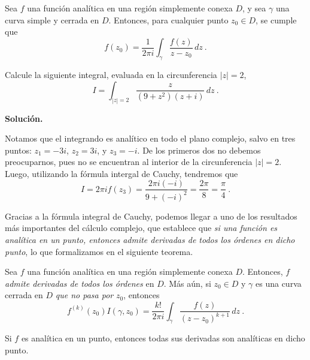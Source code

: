 \begin{corolario}
    Sea $f$ una función analítica en una región simplemente conexa $D$, y sea $\gamma$ una curva simple y cerrada en $D$. Entonces, para cualquier punto $z_0 \in D$, se cumple que 
    \begin{equation}
        f(z_0) = \frac{1}{2\pi i} \int_\gamma \frac{f(z)}{z-z_0} \, dz \ .
    \end{equation}
\end{corolario}

\begin{ejemplo}
    Calcule la siguiente integral, evaluada en la circunferencia $|z| = 2$,
    \begin{equation*}
        I = \int_{|z|=2} \frac{z}{(9+z^2)(z+i)} \, dz \ .
    \end{equation*}

    \noindent \textbf{Solución.}

    Notamos que el integrando es analítico en todo el plano complejo, salvo en tres puntos: $z_1 = -3i$, $z_2 = 3i$, y $z_3 = -i$. De los primeros dos no debemos preocuparnos, pues no se encuentran al interior de la circunferencia $|z| = 2$. Luego, utilizando la fórmula intergal de Cauchy, tendremos que 
    \begin{equation*}
        I = 2\pi i f(z_3) = \frac{2\pi i (-i)}{9+(-i)^2} = \frac{2\pi}{8} = \frac{\pi}{4} \ .
    \end{equation*}
\end{ejemplo}

Gracias a la fórmula integral de Cauchy, podemos llegar a uno de los resultados más importantes del cálculo complejo, que establece que \emph{si una función es analítica en un punto, entonces admite derivadas de todos los órdenes en dicho punto}, lo que formalizamos en el siguiente teorema.

\begin{teorema}
    Sea $f$ una función analítica en una región simplemente conexa $D$. Entonces, $f$ \emph{admite derivadas de todos los órdenes} en $D$. Más aún, si $z_0 \in D$ y $\gamma$ es una curva cerrada en $D$ \emph{que no pasa por} $z_0$, entonces 
    \begin{equation}
        f^{(k)}(z_0) I(\gamma, z_0) = \frac{k!}{2\pi i} \int_\gamma \frac{f(z)}{(z-z_0)^{k+1}} \, dz \ .
    \end{equation}
\end{teorema}

\begin{corolario}
    Si $f$ es analítica en un punto, entonces todas sus derivadas son analíticas en dicho punto.
\end{corolario}

